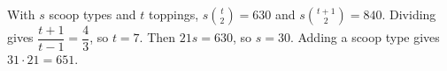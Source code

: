 With $s$ scoop types and $t$ toppings, $s\binom t2=630$ and $s\binom{t+1}{2}=840$. Dividing gives $\dfrac{t+1}{t-1}=\dfrac{4}{3}$, so $t=7$. Then $21s=630$, so $s=30$. Adding a scoop type gives $31\cdot21=\boxed{651}$.
